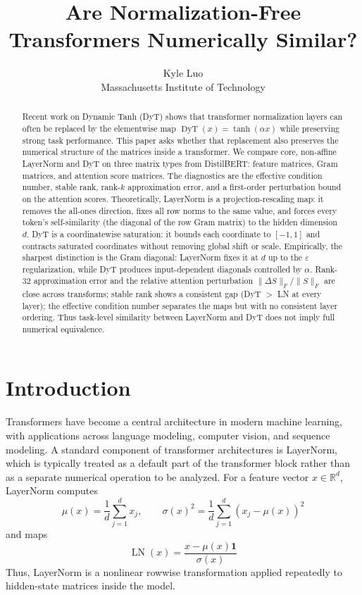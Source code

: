 \documentclass[11pt]{article}
\title{\vspace{-1em}
Are Normalization-Free Transformers Numerically Similar?
}
\author{Kyle Luo\\
Massachusetts Institute of Technology}
\date{}
\newcommand{\LN}{\operatorname{LN}}
\newcommand{\DyT}{\operatorname{DyT}}
\begin{document}
\maketitle

\begin{abstract}
Recent work on Dynamic Tanh (DyT) shows that transformer normalization layers can often be replaced by the elementwise map \(\DyT(x)=\tanh(\alpha x)\) while preserving strong task performance. This paper asks whether that replacement also preserves the numerical structure of the matrices inside a transformer. We compare core, non-affine LayerNorm and DyT on three matrix types from DistilBERT: feature matrices, Gram matrices, and attention score matrices. The diagnostics are the effective condition number, stable rank, rank-$k$ approximation error, and a first-order perturbation bound on the attention scores. Theoretically, LayerNorm is a projection-rescaling map: it removes the all-ones direction, fixes all row norms to the same value, and forces every token's self-similarity (the diagonal of the row Gram matrix) to the hidden dimension $d$. DyT is a coordinatewise saturation: it bounds each coordinate to $[-1,1]$ and contracts saturated coordinates without removing global shift or scale. Empirically, the sharpest distinction is the Gram diagonal: LayerNorm fixes it at $d$ up to the $\varepsilon$ regularization, while DyT produces input-dependent diagonals controlled by $\alpha$. Rank-$32$ approximation error and the relative attention perturbation $\|\Delta S\|_F/\|S\|_F$ are close across transforms; stable rank shows a consistent gap (DyT $>$ LN at every layer); the effective condition number separates the maps but with no consistent layer ordering. Thus task-level similarity between LayerNorm and DyT does not imply full numerical equivalence.
\end{abstract}

\section{Introduction}

Transformers have become a central architecture in modern machine learning, with applications across language modeling, computer vision, and sequence modeling. A standard component of transformer architectures is LayerNorm, which is typically treated as a default part of the transformer block rather than as a separate numerical operation to be analyzed. For a feature vector \(x\in\mathbb{R}^d\), LayerNorm computes
\begin{equation}
    \mu(x)=\frac{1}{d}\sum_{j=1}^d x_j,
    \qquad
    \sigma(x)^2=\frac{1}{d}\sum_{j=1}^d (x_j-\mu(x))^2
\label{eq:ln-statistics}
\end{equation}
and maps
\begin{equation}
    \LN(x)=\frac{x-\mu(x)\mathbf{1}}{\sigma(x)}
\label{eq:layernorm}
\end{equation}
Thus, LayerNorm is a nonlinear rowwise transformation applied repeatedly to hidden-state matrices inside the model.
\end{document}
